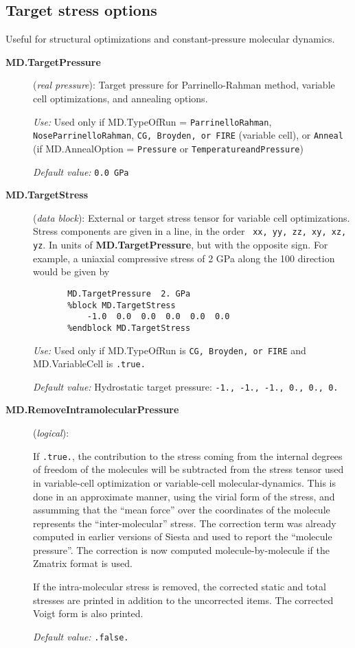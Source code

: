 \documentclass[11pt]{article}
\begin{document}
\subsection{Target stress options}

Useful for structural optimizations and constant-pressure molecular
dynamics.

\begin{description}


\item[{\bf MD.TargetPressure}] ({\it real pressure}):
Target pressure for Parrinello-Rahman method, variable cell optimizations,
and annealing options.

{\it Use:} Used only if MD.TypeOfRun =
{\tt ParrinelloRahman}, {\tt NoseParrinelloRahman},
{\tt CG, Broyden, or FIRE} (variable cell), or {\tt Anneal}
(if MD.AnnealOption = {\tt Pressure} or {\tt TemperatureandPressure})

{\it Default value:} {\tt 0.0 GPa}


\item[{\bf MD.TargetStress}] ({\it data block}):
External or target stress tensor for variable cell optimizations.
Stress components are given in a line, in the order {\tt
xx, yy, zz, xy, xz, yz}. In units of {\bf MD.TargetPressure},
but with the opposite sign. For example, a uniaxial compressive stress
of 2 GPa along the 100 direction would be given by
\begin{verbatim}
       MD.TargetPressure  2. GPa
       %block MD.TargetStress
           -1.0  0.0  0.0  0.0  0.0  0.0
       %endblock MD.TargetStress
\end{verbatim}

{\it Use:} Used only if MD.TypeOfRun is {\tt CG, Broyden, or FIRE} and
MD.VariableCell is {\tt .true.}

{\it Default value:} Hydrostatic target pressure:
{\tt -1., -1., -1., 0., 0., 0.}

\item[{\bf MD.RemoveIntramolecularPressure}] ({\it logical}):
 

If {\tt .true.}, the contribution to the stress coming from the
internal degrees of freedom of the molecules will be subtracted from
the stress tensor used in variable-cell optimization or variable-cell
molecular-dynamics.  This is done in an approximate manner, using the
virial form of the stress, and assumming that the ``mean force'' over
the coordinates of the molecule represents the ``inter-molecular''
stress. The correction term was already computed in earlier versions
of {\sc Siesta} and used to report the ``molecule pressure''. The
correction is now computed molecule-by-molecule if the Zmatrix format
is used.

If the intra-molecular stress is removed, the corrected static and
total stresses are printed in addition to the uncorrected items.
The corrected Voigt form is also printed.

{\it Default value:} {\tt .false.}
\end{description}
\end{document}
